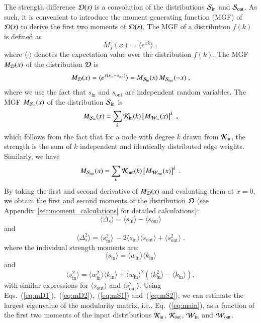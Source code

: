 \documentclass[a4paper,pre,superscriptaddress,floatfix,nofootinbib,twocolumn]{revtex4-1}
\begin{document}
The strength difference ${\cal D}(s)$ is a convolution of the distributions ${\cal S}_\text{in}$ and ${\cal S}_\text{out}$.
As such, it is convenient to introduce the moment generating function (MGF) of ${\cal D}(s)$ to derive the first two moments of ${\cal D}(s)$.
The MGF of a distribution $f(k)$ is defined as
\[
M_f(x) = \langle e^{x k} \rangle \; ,
\]
where $\langle \cdot \rangle$ denotes the expectation value over the distribution $f(k)$.
The MGF $M_{\cal D}(x)$ of the distribution ${\cal D}$ is
\[
M_{\cal D}(x) = \langle e^{x (s_\text{in} - s_\text{out})} \rangle =
M_{{\cal S}_\text{in}}(x) \, M_{{\cal S}_\text{out}}(-x) \; ,
\]
where we use the fact that $s_\text{in}$ and $s_\text{out}$ are independent random variables.
The MGF $M_{{\cal S}_\text{in}}(x)$ of the distribution ${\cal S}_\text{in}$ is
\[
M_{{\cal S}_\text{in}}(x) =
\sum_{k} {\cal K}_\text{in}(k) \left[ M_{{\cal W}_\text{in}}(x) \right]^k \; ,
\]
which follows from the fact that for a node with degree $k$ drawn from ${\cal K}_\text{in}$, the strength is the sum of $k$ independent and identically distributed edge weights. Similarly, we have
\[
M_{{\cal S}_\text{out}}(x) =
\sum_{k} {\cal K}_\text{out}(k) \left[ M_{{\cal W}_\text{out}}(x) \right]^k \; .
\]
By taking the first and second derivative of $M_{{\cal D}}(x)$ and evaluating them at $x=0$, we obtain the first and second moments of the distribution ${\cal D}$ (see Appendix~\ref{sec:moment_calculations} for detailed calculations):
\begin{equation}
\langle \Delta_{s} \rangle   = \langle s_\text{in} \rangle   - \langle s_\text{out} \rangle
\label{eq:mD1}
\end{equation}
and
\begin{equation}
\langle \Delta_{s}^2 \rangle  = \langle s^2_\text{in} \rangle \,
- 2 \langle s_\text{in} \rangle \langle s_\text{out} \rangle + \langle s^2_\text{out} \rangle \; .
\label{eq:mD2}
\end{equation}
where the individual strength moments are:
\begin{equation}
    \langle s_\text{in} \rangle = \langle w_\text{in} \rangle \langle k_{\text{in}} \rangle
    \label{eq:mS1}
\end{equation}
and
\begin{equation}
\langle s^2_\text{in} \rangle = \langle w^2_\text{in} \rangle \langle k_{\text{in}} \rangle + \langle w_\text{in} \rangle^2 \left( \langle k^2_\text{in} \rangle - \langle k_{\text{in}} \rangle  \right),
\label{eq:mS2}
\end{equation}
with similar expressions for $\langle s_\text{out} \rangle$ and $\langle s^2_\text{out} \rangle$.
Using Eqs.~(\ref{eq:mD1}),~(\ref{eq:mD2}),~(\ref{eq:mS1}) and~(\ref{eq:mS2}), we can estimate the largest eigenvalue of the modularity matrix, i.e., Eq.~(\ref{eq:main}), as a function of the first two moments of the input distributions ${\cal K}_\text{in}$, ${\cal K}_\text{out}$, ${\cal W}_\text{in}$ and ${\cal W}_\text{out}$.
\end{document}
